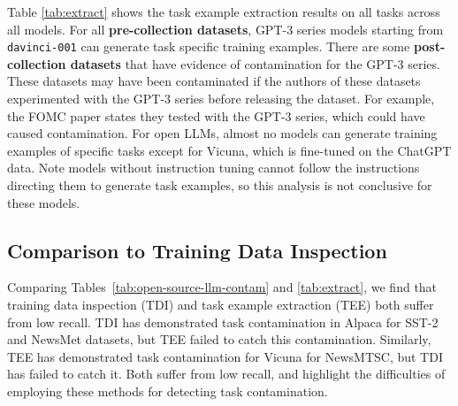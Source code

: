 \documentclass[letterpaper]{article} %
\newcommand{\jmf}[1]{}      %
\begin{document}
Table \ref{tab:extract} shows the task example extraction results on all tasks across all models. For all \textbf{pre-collection datasets}, GPT-3 series models starting from \texttt{davinci-001} can generate task specific training examples. There are some \textbf{post-collection datasets} that have evidence of contamination for the GPT-3 series. These datasets may have been contaminated if the authors of these datasets experimented with the GPT-3 series before releasing the dataset. For example, the FOMC paper \cite{shah2023} states they tested with the GPT-3 series, which could have caused contamination. For open LLMs, almost no models can generate training examples of specific tasks except for Vicuna, which is fine-tuned on the ChatGPT data. Note models without instruction tuning cannot follow the instructions directing them to generate task examples, so this analysis is not conclusive for these models.

\subsection{Comparison to Training Data Inspection}

\jmf{Add Comparison to Training Data Inspection}

\jmf{Neither are perfectly reliable}

Comparing Tables~\ref{tab:open-source-llm-contam} and \ref{tab:extract}, we find that training data inspection (TDI) and task example extraction (TEE) both suffer from low recall.  TDI has demonstrated task contamination in Alpaca for SST-2 and NewsMet datasets, but TEE failed to catch this contamination.  Similarly, TEE has demonstrated task contamination for Vicuna for NewsMTSC, but TDI has failed to catch it.  Both suffer from low recall, and highlight the difficulties of employing these methods for detecting task contamination.
\end{document}
